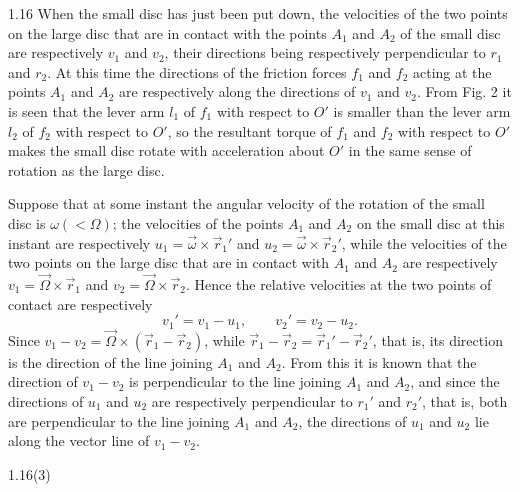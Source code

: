 \begin{solution}{1.16}
When the small disc has just been put down, the velocities of the two points on the large disc that are in contact with the points $A_1$ and $A_2$ of the small disc are respectively $v_1$ and $v_2$, their directions being respectively perpendicular to $r_1$ and $r_2$. At this time the directions of the friction forces $f_1$ and $f_2$ acting at the points $A_1$ and $A_2$ are respectively along the directions of $v_1$ and $v_2$. From Fig. 2 it is seen that the lever arm $l_1$ of $f_1$ with respect to $O'$ is smaller than the lever arm $l_2$ of $f_2$ with respect to $O'$, so the resultant torque of $f_1$ and $f_2$ with respect to $O'$ makes the small disc rotate with acceleration about $O'$ in the same sense of rotation as the large disc.

Suppose that at some instant the angular velocity of the rotation of the small disc is $\omega(<\Omega)$; the velocities of the points $A_1$ and $A_2$ on the small disc at this instant are respectively $u_1=\vec{\omega}\times\vec{r}_1'$ and $u_2=\vec{\omega}\times\vec{r}_2'$, while the velocities of the two points on the large disc that are in contact with $A_1$ and $A_2$ are respectively $v_1=\vec{\Omega}\times\vec{r}_1$ and $v_2=\vec{\Omega}\times\vec{r}_2$. Hence the relative velocities at the two points of contact are respectively
\[
v_1'=v_1-u_1,\qquad v_2'=v_2-u_2.
\]
Since $v_1-v_2=\vec{\Omega}\times(\vec{r}_1-\vec{r}_2)$, while $\vec{r}_1-\vec{r}_2=\vec{r}_1'-\vec{r}_2'$, that is, its direction is the direction of the line joining $A_1$ and $A_2$. From this it is known that the direction of $v_1-v_2$ is perpendicular to the line joining $A_1$ and $A_2$, and since the directions of $u_1$ and $u_2$ are respectively perpendicular to $r_1'$ and $r_2'$, that is, both are perpendicular to the line joining $A_1$ and $A_2$, the directions of $u_1$ and $u_2$ lie along the vector line of $v_1-v_2$.

\begin{figbox}{1.16(3)}
\end{figbox}


\end{solution}

